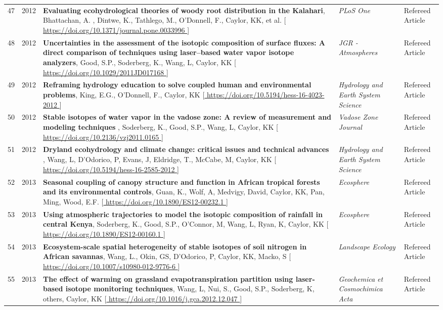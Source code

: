 \begin{supertabular}{lcp{8.25cm}p{4.75cm}p{1.75cm}}
47 & 2012 & {\bf Evaluating ecohydrological theories of woody root distribution in the Kalahari}, Bhattachan, A. , Dintwe, K., Tathlego, M., O'Donnell, F., Caylor, KK, et al. [\url{ https://doi.org/10.1371/journal.pone.0033996 }] & \emph{ PLoS One } & Refereed Article\\
48 & 2012 & {\bf Uncertainties in the assessment of the isotopic composition of surface fluxes: A direct comparison of techniques using laser--based water vapor isotope analyzers}, Good, S.P., Soderberg, K., Wang, L, Caylor, KK [\url{ https://doi.org/10.1029/2011JD017168 }] & \emph{ JGR - Atmospheres } & Refereed Article\\
49 & 2012 & {\bf Reframing hydrology education to solve coupled human and environmental problems}, King, E.G., O'Donnell, F., Caylor, KK [\url{ https://doi.org/10.5194/hess-16-4023-2012 }] & \emph{ Hydrology and Earth System Science } & Refereed Article\\
50 & 2012 & {\bf Stable isotopes of water vapor in the vadose zone: A review of measurement and modeling techniques 
}, Soderberg, K., Good, S.P., Wang, L, Caylor, KK [\url{ https://doi.org/10.2136/vzj2011.0165 }] & \emph{ Vadose Zone Journal } & Refereed Article\\
51 & 2012 & {\bf Dryland ecohydrology and climate change: critical issues and technical advances }, Wang, L, D'Odorico, P, Evans, J, Eldridge, T., McCabe, M, Caylor, KK [\url{ https://doi.org/10.5194/hess-16-2585-2012 }] & \emph{ Hydrology and Earth System Science } & Refereed Article\\
52 & 2013 & {\bf Seasonal coupling of canopy structure and function in African tropical forests and its environmental controls}, Guan, K., Wolf, A, Medvigy, David, Caylor, KK, Pan, Ming, Wood, E.F. [\url{ https://doi.org/10.1890/ES12-00232.1 }] & \emph{ Ecosphere } & Refereed Article\\
53 & 2013 & {\bf Using atmospheric trajectories to model the isotopic composition of rainfall in central Kenya}, Soderberg, K., Good, S.P., O'Connor, M, Wang, L, Ryan, K, Caylor, KK [\url{ https://doi.org/10.1890/ES12-00160.1 }] & \emph{ Ecosphere } & Refereed Article\\
54 & 2013 & {\bf Ecosystem-scale spatial heterogeneity of stable isotopes of soil nitrogen in African savannas}, Wang, L., Okin, GS, D'Odorico, P, Caylor, KK, Macko, S [\url{ https://doi.org/10.1007/s10980-012-9776-6 }] & \emph{ Landscape Ecology } & Refereed Article\\
55 & 2013 & {\bf The effect of warming on grassland evapotranspiration partition using laser-based isotope monitoring techniques}, Wang, L, Nui, S., Good, S.P., Soderberg, K, others, Caylor, KK [\url{ https://doi.org/10.1016/j.gca.2012.12.047 }] & \emph{ Geochemica et Cosmochimica Acta } & Refereed Article\\

\end{supertabular}
